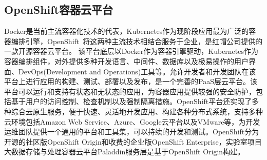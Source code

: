 \subsection{OpenShift容器云平台}
\label{chap1:sample:table} 
Docker是当前主流容器化技术的代表，Kubernetes作为现阶段应用最为广泛的容器编排引擎，OpenShift~\cite{Lossent2017PaaS}将这两种主流技术相结合服务于企业，是红帽公司提供的一款开源容器云平台。
该平台底层以Docker作为容器引擎驱动，Kubernetes作为容器编排组件，对外提供多种开发语言、中间件、数据库以及极易操作的用户界面、DevOps(Development and Operations)工具等。允许开发者和开发团队在该平台上进行应用的构建、测试、部署以及发布，是一个完善的PaaS层云平台。该平台可以运行和支持有状态和无状态的应用，为容器应用提供较强的安全防护，包括基于用户的访问控制、检查机制以及强制隔离措施。OpenShift平台还实现了多种综合云原生服务，便于快速、灵活地开发应用、构建各种分布式系统，支持多种云环境包括Amazon Web Service、Azure、Google云平台以及VMware等，为开发运维团队提供一个通用的平台和工具集，可以持续的开发和测试。OpenShift分为开源的社区版OpenShift Origin和收费的企业版OpenShift Enterprise，实验室项目大数据存储与处理容器云平台Paladdin服务层是基于OpenShift Origin构建。

